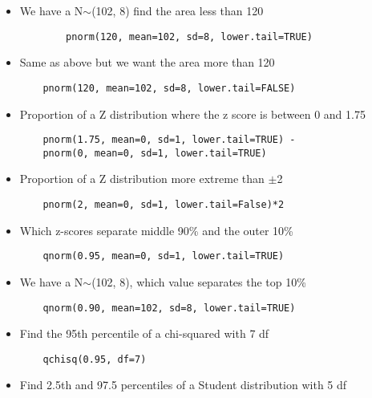 \begin{itemize}
    \item We have a N$\sim$(102, 8) find the area less than 120

    \begin{verbatim}
        pnorm(120, mean=102, sd=8, lower.tail=TRUE)
    \end{verbatim}

\item Same as above but we want the area more than 120

\begin{verbatim}
    pnorm(120, mean=102, sd=8, lower.tail=FALSE)
\end{verbatim}

\item Proportion of a Z distribution where the z score is between 0 and 1.75

\begin{verbatim}
    pnorm(1.75, mean=0, sd=1, lower.tail=TRUE) - 
    pnorm(0, mean=0, sd=1, lower.tail=TRUE)
\end{verbatim}

\item Proportion of a Z distribution more extreme than $\pm$2

\begin{verbatim}
    pnorm(2, mean=0, sd=1, lower.tail=False)*2
\end{verbatim}

\item Which z-scores separate middle 90\% and the outer 10\%

\begin{verbatim}
    qnorm(0.95, mean=0, sd=1, lower.tail=TRUE)
\end{verbatim}

\item We have a N$\sim$(102, 8), which value separates the top 10\%

\begin{verbatim}
    qnorm(0.90, mean=102, sd=8, lower.tail=TRUE) 
\end{verbatim}

\item Find the 95th percentile of a chi-squared with 7 df

\begin{verbatim}
    qchisq(0.95, df=7)
\end{verbatim}

\item Find 2.5th and 97.5 percentiles of a Student distribution with 5 df


\end{itemize}
